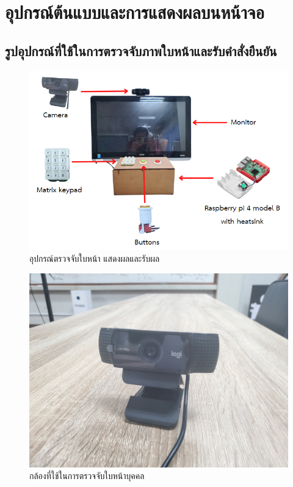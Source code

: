 \chapter{อุปกรณ์ต้นแบบและการแสดงผลบนหน้าจอ}



\section{รูปอุปกรณ์ที่ใช้ในการตรวจจับภาพใบหน้าและรับคำสั่งยืนยัน}

\begin{figure}[!ht]
  \begin{center}
    \includegraphics[scale=.6]{pic/overall_module.png}
    \caption[อุปกรณ์ตรวจจับใบหน้า แสดงผลและรับผล]{อุปกรณ์ตรวจจับใบหน้า แสดงผลและรับผล}
    \label{fig:module_pi}
  \end{center}
\end{figure}




\begin{figure}[!ht]
  \begin{center}
    \includegraphics[scale=.15]{pic/camera.jpg}
    \caption[กล้องที่ใช้ในการตรวจจับใบหน้าบุคคล]{กล้องที่ใช้ในการตรวจจับใบหน้าบุคคล}
    \label{fig:camera_logi}
  \end{center}
\end{figure}

